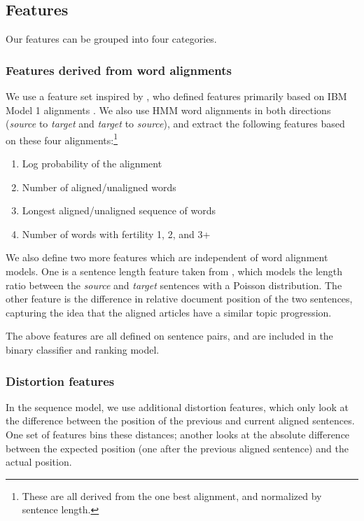 \subsection{Features}
\label{sec:features}
Our features can be grouped into four categories.

\subsubsection{Features derived from word alignments}

We use a feature set inspired by \citep{Munteanu05}, who defined
features primarily based on IBM Model 1 alignments
\citep{Brown93}.  We also use HMM word alignments
\citep{Vogel96} in both directions ({\em source} to {\em target} and
{\em target} to {\em source}), and extract the following features based on these
four alignments:\footnote{These are all derived from the one best alignment, and
normalized by sentence length.}

\begin{enumerate}
\item Log probability of the alignment
\item Number of aligned/unaligned words
\item Longest aligned/unaligned sequence of words
\item Number of words with fertility 1, 2, and 3+
\end{enumerate}

We also define two more features which are independent of word alignment
models.  One is a sentence length feature taken from \citep{Moore02}, which
models the length ratio between the {\em source} and {\em target} sentences with
a Poisson distribution.  The other feature is the difference in relative
document position of the two sentences, capturing the idea that the aligned
articles have a similar topic progression.

The above features are all defined on sentence pairs, and are included in the
binary classifier and ranking model.
\subsubsection{Distortion features} In the sequence model, we use additional distortion
features, which only look at the difference between the position
of the previous and current aligned sentences.  One set of
features bins these distances; another looks at the
absolute difference between the expected position (one after the
previous aligned sentence) and the actual position.

